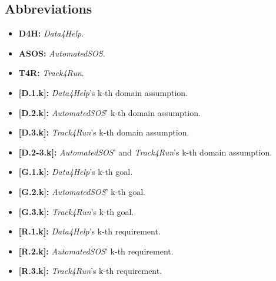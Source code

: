    \subsection{Abbreviations}
        \begin{itemize}
            \item \textbf{D4H:} \emph{Data4Help}.
            
            \item \textbf{ASOS:} \emph{AutomatedSOS}.
            
            \item \textbf{T4R:} \emph{Track4Run}.
            
            \item \textbf{[D.1.k]:} \emph{Data4Help}'s k-th domain assumption.
            
            \item \textbf{[D.2.k]:} \emph{AutomatedSOS}' k-th domain assumption.
            
            \item \textbf{[D.3.k]:} \emph{Track4Run}'s k-th domain assumption.
            
            \item  \textbf{[D.2-3.k]:} \emph{AutomatedSOS}' and \emph{Track4Run}'s k-th domain assumption.
            
            \item \textbf{[G.1.k]:} \emph{Data4Help}'s k-th goal.
            
            \item \textbf{[G.2.k]:} \emph{AutomatedSOS}' k-th goal.
            
            \item \textbf{[G.3.k]:} \emph{Track4Run}'s k-th goal.
            
            \item \textbf{[R.1.k]:} \emph{Data4Help}'s k-th requirement.
            
            \item \textbf{[R.2.k]:} \emph{AutomatedSOS}' k-th requirement.
            
            \item \textbf{[R.3.k]:} \emph{Track4Run}'s k-th requirement.
        \end{itemize}